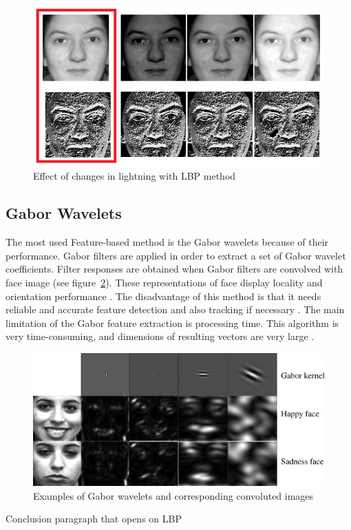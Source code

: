 \begin{figure}[!h]
\begin{center}
\noindent \includegraphics[scale=0.6]{figures/lbp_change_lightning} 
\newline
\caption{Effect of changes in lightning with LBP method}
\label{lbp_change_lightning}
\end{center} 
\end{figure}

\subsection{Gabor Wavelets}

\vspace{\baselineskip}
\noindent The most used Feature-based method is the Gabor wavelets because of their performance. Gabor filters are applied in order to extract a set of Gabor wavelet coefficients. Filter responses are obtained when Gabor filters are convolved with face image (see figure~\ref{gabor_wavelets_example}). These representations of face display locality and orientation performance \cite{JEM09}. The disadvantage of this method is that it needs reliable and accurate feature detection and also tracking if necessary \cite{SHA09}. The main limitation of the Gabor feature extraction is processing time. This algorithm is very time-consuming, and dimensions of resulting vectors are very large \cite{PRA09}.
\newline

\begin{figure}[!h]
\begin{center}
\noindent \includegraphics[scale=1]{figures/gabor_wavelets_example} 
\newline
\caption{Examples of Gabor wavelets and corresponding convoluted images}
\label{gabor_wavelets_example}
\end{center} 
\end{figure}

\noindent Conclusion paragraph that opens on LBP

